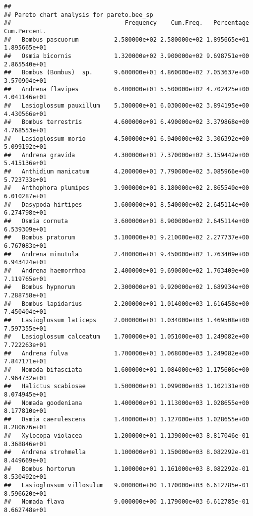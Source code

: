 \documentclass[
]{article}
\begin{document}
\begin{verbatim}
##                            
## Pareto chart analysis for pareto.bee_sp
##                                Frequency    Cum.Freq.   Percentage Cum.Percent.
##   Bombus pascuorum          2.580000e+02 2.580000e+02 1.895665e+01 1.895665e+01
##   Osmia bicornis            1.320000e+02 3.900000e+02 9.698751e+00 2.865540e+01
##   Bombus (Bombus)  sp.      9.600000e+01 4.860000e+02 7.053637e+00 3.570904e+01
##   Andrena flavipes          6.400000e+01 5.500000e+02 4.702425e+00 4.041146e+01
##   Lasioglossum pauxillum    5.300000e+01 6.030000e+02 3.894195e+00 4.430566e+01
##   Bombus terrestris         4.600000e+01 6.490000e+02 3.379868e+00 4.768553e+01
##   Lasioglossum morio        4.500000e+01 6.940000e+02 3.306392e+00 5.099192e+01
##   Andrena gravida           4.300000e+01 7.370000e+02 3.159442e+00 5.415136e+01
##   Anthidium manicatum       4.200000e+01 7.790000e+02 3.085966e+00 5.723733e+01
##   Anthophora plumipes       3.900000e+01 8.180000e+02 2.865540e+00 6.010287e+01
##   Dasypoda hirtipes         3.600000e+01 8.540000e+02 2.645114e+00 6.274798e+01
##   Osmia cornuta             3.600000e+01 8.900000e+02 2.645114e+00 6.539309e+01
##   Bombus pratorum           3.100000e+01 9.210000e+02 2.277737e+00 6.767083e+01
##   Andrena minutula          2.400000e+01 9.450000e+02 1.763409e+00 6.943424e+01
##   Andrena haemorrhoa        2.400000e+01 9.690000e+02 1.763409e+00 7.119765e+01
##   Bombus hypnorum           2.300000e+01 9.920000e+02 1.689934e+00 7.288758e+01
##   Bombus lapidarius         2.200000e+01 1.014000e+03 1.616458e+00 7.450404e+01
##   Lasioglossum laticeps     2.000000e+01 1.034000e+03 1.469508e+00 7.597355e+01
##   Lasioglossum calceatum    1.700000e+01 1.051000e+03 1.249082e+00 7.722263e+01
##   Andrena fulva             1.700000e+01 1.068000e+03 1.249082e+00 7.847171e+01
##   Nomada bifasciata         1.600000e+01 1.084000e+03 1.175606e+00 7.964732e+01
##   Halictus scabiosae        1.500000e+01 1.099000e+03 1.102131e+00 8.074945e+01
##   Nomada goodeniana         1.400000e+01 1.113000e+03 1.028655e+00 8.177810e+01
##   Osmia caerulescens        1.400000e+01 1.127000e+03 1.028655e+00 8.280676e+01
##   Xylocopa violacea         1.200000e+01 1.139000e+03 8.817046e-01 8.368846e+01
##   Andrena strohmella        1.100000e+01 1.150000e+03 8.082292e-01 8.449669e+01
##   Bombus hortorum           1.100000e+01 1.161000e+03 8.082292e-01 8.530492e+01
##   Lasioglossum villosulum   9.000000e+00 1.170000e+03 6.612785e-01 8.596620e+01
##   Nomada flava              9.000000e+00 1.179000e+03 6.612785e-01 8.662748e+01

\end{verbatim}
\end{document}
